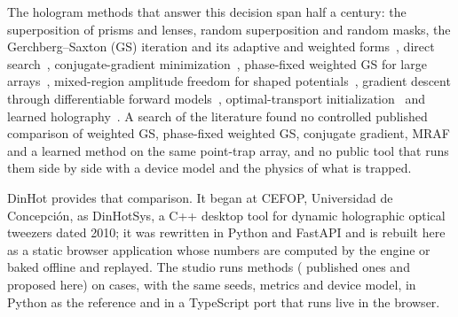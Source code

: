 The hologram methods that answer this decision span half a century: the superposition of prisms and lenses, random superposition and random masks, the Gerchberg--Saxton (GS) iteration and its adaptive and weighted forms~\cite{dileonardo}, direct search~\cite{polin}, conjugate-gradient minimization~\cite{harte}, phase-fixed weighted GS for large arrays~\cite{kim2019}, mixed-region amplitude freedom for shaped potentials~\cite{pasienski}, gradient descent through differentiable forward models~\cite{chakra}, optimal-transport initialization~\cite{swan,torchylo} and learned holography~\cite{eybposh}. A search of the literature found no controlled published comparison of weighted GS, phase-fixed weighted GS, conjugate gradient, MRAF and a learned method on the same point-trap array, and no public tool that runs them side by side with a device model and the physics of what is trapped.

DinHot provides that comparison. It began at CEFOP, Universidad de Concepci\'on, as DinHotSys, a C++ desktop tool for dynamic holographic optical tweezers dated 2010; it was rewritten in Python and FastAPI and is rebuilt here as a static browser application whose numbers are computed by the engine or baked offline and replayed. The studio runs \nLadder{} methods (\nPublished{} published ones and \nProposed{} proposed here) on \nCases{} cases, with the same seeds, metrics and device model, in Python as the reference and in a TypeScript port that runs live in the browser.

